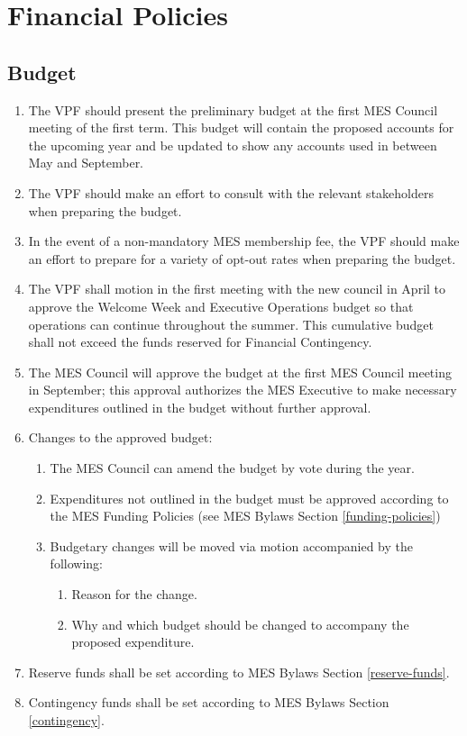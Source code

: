 \section{Financial Policies}
\label{financial-policies}

\subsection{Budget}
\label{budget}
\begin{enumerate}
 \item
  The VPF should present the preliminary budget at the first MES Council
  meeting of the first term. This budget will contain the proposed
  accounts for the upcoming year and be updated to show any accounts
  used in between May and September.
 \item
  The VPF should make an effort to consult with the relevant
  stakeholders when preparing the budget.
 \item
  In the event of a non-mandatory MES membership fee, the VPF should
  make an effort to prepare for a variety of opt-out rates when
  preparing the budget.
 \item
  The VPF shall motion in the first meeting with the new council in
  April to approve the Welcome Week and Executive Operations budget so
  that operations can continue throughout the summer. This cumulative
  budget shall not exceed the funds reserved for Financial Contingency.
 \item
  The MES Council will approve the budget at the first MES Council
  meeting in September; this approval authorizes the MES Executive to
  make necessary expenditures outlined in the budget without further
  approval.
 \item
  Changes to the approved budget:

  \begin{enumerate}
   \item
    The MES Council can amend the budget by vote during the year.
   \item
    Expenditures not outlined in the budget must be approved according
    to the MES Funding Policies (see MES Bylaws Section
    \ref{funding-policies})
   \item
    Budgetary changes will be moved via motion accompanied by the
    following:

    \begin{enumerate}
     \item
      Reason for the change.
     \item
      Why and which budget should be changed to accompany the proposed
      expenditure.
    \end{enumerate}
  \end{enumerate}
 \item
  Reserve funds shall be set according to MES Bylaws Section
  \ref{reserve-funds}.
 \item
  Contingency funds shall be set according to MES Bylaws Section
  \ref{contingency}.

\end{enumerate}

